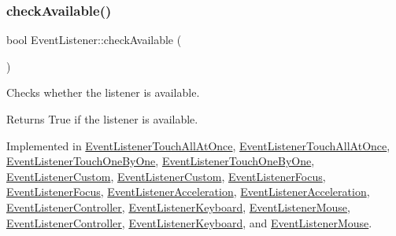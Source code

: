 \subsubsection{\texorpdfstring{check\+Available()}{checkAvailable()}\hspace{0.1cm}{\footnotesize\ttfamily [1/2]}}
{\footnotesize\ttfamily bool Event\+Listener\+::check\+Available (\begin{DoxyParamCaption}{ }\end{DoxyParamCaption})\hspace{0.3cm}{\ttfamily [pure virtual]}}

Checks whether the listener is available.

\begin{DoxyReturn}{Returns}
True if the listener is available. 
\end{DoxyReturn}


Implemented in \hyperlink{classEventListenerTouchAllAtOnce_aa694c16160c353ed089ab1b80b003066}{Event\+Listener\+Touch\+All\+At\+Once}, \hyperlink{classEventListenerTouchAllAtOnce_a2bae6413f00f5afbe6dfc39985ec76cf}{Event\+Listener\+Touch\+All\+At\+Once}, \hyperlink{classEventListenerTouchOneByOne_a013a626d35805cc6ca030d9f9883610b}{Event\+Listener\+Touch\+One\+By\+One}, \hyperlink{classEventListenerTouchOneByOne_af14f012850827bf3464369245611c05e}{Event\+Listener\+Touch\+One\+By\+One}, \hyperlink{classEventListenerCustom_a2de79f2f69bd89f68216b5467ed9f50b}{Event\+Listener\+Custom}, \hyperlink{classEventListenerCustom_a9be3f3ad1e20340dda29e33fe06de444}{Event\+Listener\+Custom}, \hyperlink{classEventListenerFocus_acc03526a7e5478b87327f3e8c28ded12}{Event\+Listener\+Focus}, \hyperlink{classEventListenerFocus_a103c10ed16e8ef1ddce0965d1e1c40c6}{Event\+Listener\+Focus}, \hyperlink{classEventListenerAcceleration_aa69415757d82f35612610dc767fd0aab}{Event\+Listener\+Acceleration}, \hyperlink{classEventListenerAcceleration_a3226671264e6e4dd44a29e36986eba11}{Event\+Listener\+Acceleration}, \hyperlink{classEventListenerController_af3f384634b0fa0e0f9d5c3f152aef42b}{Event\+Listener\+Controller}, \hyperlink{classEventListenerKeyboard_a855c94e047e48d3ab419ae43280231c3}{Event\+Listener\+Keyboard}, \hyperlink{classEventListenerMouse_acf0e2a02290738775a08c6032c741d38}{Event\+Listener\+Mouse}, \hyperlink{classEventListenerController_a82ea8138d323671c6811b69deb297da7}{Event\+Listener\+Controller}, \hyperlink{classEventListenerKeyboard_a7f7d0c2e82388278bfc98ff457dc2da8}{Event\+Listener\+Keyboard}, and \hyperlink{classEventListenerMouse_ac60e3ef56883beeb2f8660c921421e63}{Event\+Listener\+Mouse}.

